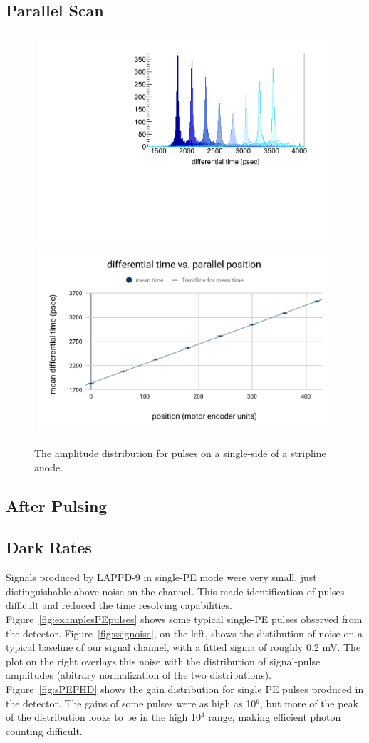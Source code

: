 \documentclass[preprint,12pt]{elsarticle}
\begin{document}
\subsection{Parallel Scan}


\begin{figure}
	\centering
        \begin{tabular}{l}
                \includegraphics[width=0.6\linewidth]{plots/difftime} \\
                \includegraphics[width=0.58\linewidth]{plots/differentialtimevsparallelposition}
         \end{tabular}  
       \caption{The amplitude distribution for pulses on a single-side of a stripline anode.}
	\label{fig:amp}
\end{figure}


\subsection{After Pulsing}

\subsection{Dark Rates}

\noindent Signals produced by LAPPD-9 in single-PE mode were very small, just distinguishable above noise on the channel. This made identification of pulses difficult and reduced the time resolving capabilities. Figure~\ref{fig:examplesPEpulses} shows some typical single-PE pulses observed from the detector. Figure~\ref{fig:ssignoise}, on the left, shows the distibution of noise on a typical baseline of our signal channel, with a fitted sigma of roughly 0.2 mV. The plot on the right overlays this noise with the distribution of signal-pulse amplitudes (abitrary normalization of the two distributions). Figure~\ref{fig:sPEPHD} shows the gain distribution for single PE pulses produced in the detector. The gains of some pulses  were as high as 10$^6$, but more of the peak of the distribution looks to be in the high 10$^4$ range, making efficient photon counting difficult.
\end{document}
